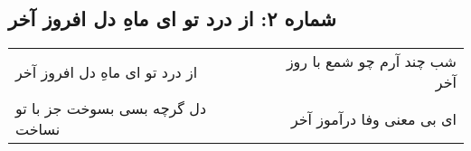 \begin{center}
\section*{شماره ۲: از درد تو ای ماهِ دل افروز آخر}
\label{sec:002}
\begin{longtable}{l p{0.5cm} r}
از درد تو ای ماهِ دل افروز آخر
&&
شب چند آرم چو شمع با روز آخر
\\
دل گرچه بسی بسوخت جز با تو نساخت
&&
ای بی معنی وفا درآموز آخر
\\
\end{longtable}
\end{center}
